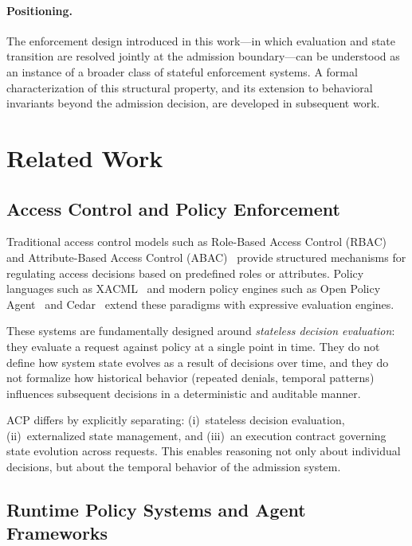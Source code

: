 \documentclass[11pt]{article}
\theoremstyle{definition}
\begin{document}
\paragraph{Positioning.}
The enforcement design introduced in this work---in which evaluation
and state transition are resolved jointly at the admission
boundary---can be understood as an instance of a broader class of
stateful enforcement systems. A formal characterization of this
structural property, and its extension to behavioral invariants
beyond the admission decision, are developed in subsequent work.

\section{Related Work}
\label{sec:related-work}

\subsection{Access Control and Policy Enforcement}

Traditional access control models such as Role-Based Access Control (RBAC)~\cite{sandhu1996rbac}
and Attribute-Based Access Control (ABAC)~\cite{hu2015abac} provide structured mechanisms for
regulating access decisions based on predefined roles or attributes.
Policy languages such as XACML~\cite{oasis2013xacml} and modern policy engines such as
Open Policy Agent~\cite{opa} and Cedar~\cite{cedar} extend these paradigms with expressive
evaluation engines.

These systems are fundamentally designed around \emph{stateless decision evaluation}:
they evaluate a request against policy at a single point in time.
They do not define how system state evolves as a result of decisions over time,
and they do not formalize how historical behavior (repeated denials, temporal patterns)
influences subsequent decisions in a deterministic and auditable manner.

ACP differs by explicitly separating:
(i)~stateless decision evaluation,
(ii)~externalized state management, and
(iii)~an execution contract governing state evolution across requests.
This enables reasoning not only about individual decisions, but about the temporal behavior
of the admission system.

\subsection{Runtime Policy Systems and Agent Frameworks}
\end{document}
